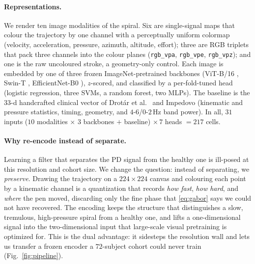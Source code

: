 \documentclass{article}
\begin{document}
\paragraph{Representations.}
We render ten image modalities of the spiral. Six are single-signal maps that colour
the trajectory by one channel with a perceptually uniform colormap (velocity,
acceleration, pressure, azimuth, altitude, effort); three are RGB triplets that pack
three channels into the colour planes (\texttt{rgb\_vpa}, \texttt{rgb\_vpe},
\texttt{rgb\_vpz}); and one is the raw uncoloured stroke, a geometry-only control.
Each image is embedded by one of three frozen ImageNet-pretrained backbones (ViT-B/16
\citep{dosovitskiy2021vit}, Swin-T \citep{liu2021swin}, EfficientNet-B0
\citep{tan2019efficientnet}), $z$-scored, and classified by a per-fold-tuned head
(logistic regression, three SVMs, a random forest, two MLPs). The baseline is the
$33$-d handcrafted clinical vector of Drot\'ar et al.\ \citep{drotar2016} and
Impedovo \citep{impedovo2019} (kinematic and pressure statistics, timing, geometry,
and $4$-$6$/$0$-$2$\,Hz band power). In all, $31$ inputs ($10$ modalities $\times$ $3$
backbones $+$ baseline) $\times\,7$ heads $=217$ cells.

\paragraph{Why re-encode instead of separate.}
Learning a filter that separates the PD signal from the healthy one is ill-posed at
this resolution and cohort size. We change the question: instead of separating, we
\emph{preserve}. Drawing the trajectory on a $224\times224$ canvas and colouring each
point by a kinematic channel is a quantization that records \emph{how fast},
\emph{how hard}, and \emph{where} the pen moved, discarding only the fine phase that
\eqref{eq:gabor} says we could not have recovered. The encoding keeps the structure
that distinguishes a slow, tremulous, high-pressure spiral from a healthy one, and
lifts a one-dimensional signal into the two-dimensional input that large-scale visual
pretraining is optimized for. This is the dual advantage: it sidesteps the resolution
wall and lets us transfer a frozen encoder a $72$-subject cohort could never train
(Fig.~\ref{fig:pipeline}).
\end{document}
